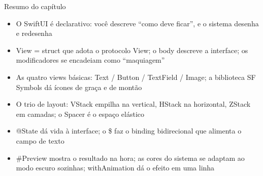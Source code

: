 \begin{tcbsummary}{Resumo do capítulo}
\begin{itemize}
  \item O SwiftUI é declarativo: você descreve “como deve ficar”, e o sistema desenha e redesenha
  \item View = struct que adota o protocolo View; o body descreve a interface; os modificadores se encadeiam como “maquiagem”
  \item As quatro views básicas: Text / Button / TextField / Image; a biblioteca SF Symbols dá ícones de graça e de montão
  \item O trio de layout: VStack empilha na vertical, HStack na horizontal, ZStack em camadas; o Spacer é o espaço elástico
  \item @State dá vida à interface; o \$ faz o binding bidirecional que alimenta o campo de texto
  \item \#Preview mostra o resultado na hora; as cores do sistema se adaptam ao modo escuro sozinhas; withAnimation dá o efeito em uma linha
\end{itemize}

\end{tcbsummary}
